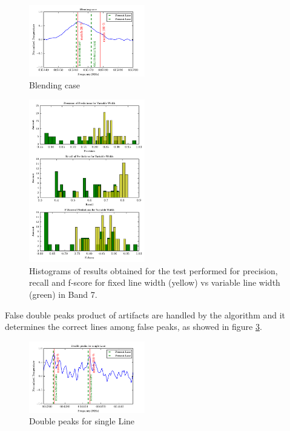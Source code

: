 \begin{figure}[H]
	\begin{center}
		\includegraphics[width=0.45\textwidth]{images/blending}
		\caption{ Blending case }
		\label{fig:blending}
	\end{center}
\end{figure}

\begin{figure}[H]
	\begin{center}
		\includegraphics[width=0.45\textwidth]{images/hist2}
		\caption{ Histograms of results obtained for the test performed for precision, recall and f-score for fixed line width (yellow) vs variable line width (green) in Band 7.}
		\label{fig:hist2}
	\end{center}
\end{figure}


False double peaks product of artifacts are handled by the algorithm and it determines the correct lines among false peaks, as showed in figure \ref{fig:doublepeak}.

\begin{figure}[H]
	\begin{center}
		\includegraphics[width=0.45\textwidth]{images/doublepeak}
		\caption{ Double peaks for single Line }
		\label{fig:doublepeak}
	\end{center}
\end{figure}

